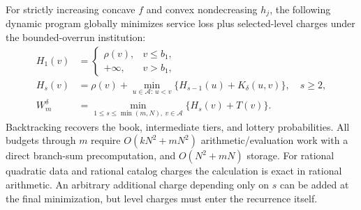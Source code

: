 \begin{theorem}\label{thm:catalog}
For strictly increasing concave $f$ and convex nondecreasing $h_j$, the following dynamic program globally minimizes service loss plus selected-level charges under the bounded-overrun institution:
\begin{align}
 H_1(v)&=\begin{cases}\rho(v),&v\leq b_1,\\+\infty,&v>b_1,\end{cases}\nonumber\\
 H_s(v)&=\rho(v)+\min_{u\in\mathcal A:\,u<v}\{H_{s-1}(u)+K_\delta(u,v)\},\quad s\geq2,\label{eq:catalog-dp}\\
 W_m^\delta&=\min_{1\leq s\leq\min(m,N),\ v\in\mathcal A}
                  \{H_s(v)+T(v)\}.\nonumber
\end{align}
Backtracking recovers the book, intermediate tiers, and lottery probabilities. All budgets through $m$ require $O(kN^2+mN^2)$ arithmetic/evaluation work with a direct branch-sum precomputation, and $O(N^2+mN)$ storage. For rational quadratic data and rational catalog charges the calculation is exact in rational arithmetic. An arbitrary additional charge depending only on $s$ can be added at the final minimization, but level charges must enter the recurrence itself.
\end{theorem}
